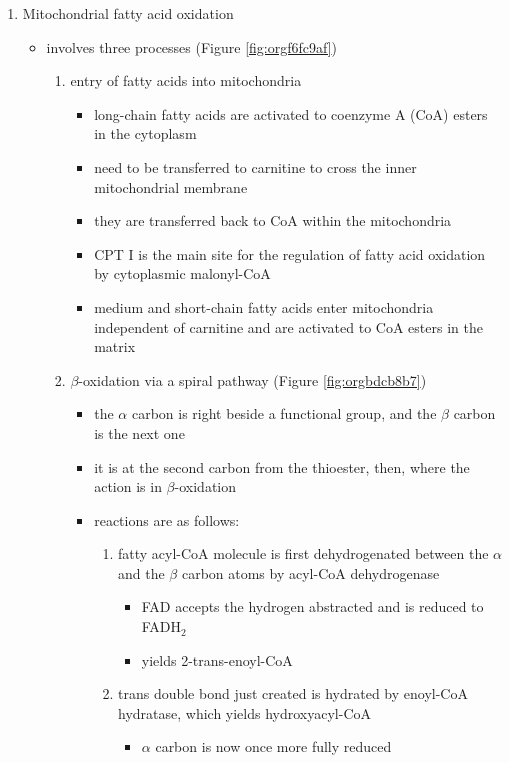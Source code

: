\documentclass{scrartcl}
\begin{document}
\begin{enumerate}
\item Mitochondrial fatty acid oxidation
\label{sec:org0e7dae5}

\begin{itemize}
\item involves three processes (Figure \ref{fig:orgf6fc9af})
\begin{enumerate}
\item entry of fatty acids into mitochondria
\begin{itemize}
\item long-chain fatty acids are activated to coenzyme A (CoA) esters
in the cytoplasm
\item need to be transferred to carnitine to cross the inner
mitochondrial membrane
\item they are transferred back to CoA within the mitochondria
\item CPT I is the main site for the regulation of fatty acid
oxidation by cytoplasmic malonyl-CoA
\item medium and short-chain fatty acids enter mitochondria
independent of carnitine and are activated to CoA esters in the
matrix
\end{itemize}
\item \(\beta\)-oxidation via a spiral pathway (Figure \ref{fig:orgbdcb8b7})
\begin{itemize}
\item the \(\alpha\) carbon is right beside a functional group, and the
\(\beta\) carbon is the next one
\item it is at the second carbon from the thioester, then, where the
action is in \(\beta\)-oxidation
\item reactions are as follows:
\begin{enumerate}
\item fatty acyl-CoA molecule is first dehydrogenated between the \(\alpha\)
and the \(\beta\) carbon atoms by acyl-CoA dehydrogenase
\begin{itemize}
\item FAD accepts the hydrogen abstracted and is reduced to FADH\(_{\text{2}}\)
\item yields 2-trans-enoyl-CoA
\end{itemize}
\item trans double bond just created is hydrated by enoyl-CoA
hydratase, which yields hydroxyacyl-CoA
\begin{itemize}
\item \(\alpha\) carbon is now once more fully reduced

\end{itemize}
\end{enumerate}
\end{itemize}
\end{enumerate}
\end{itemize}
\end{enumerate}
\end{document}
